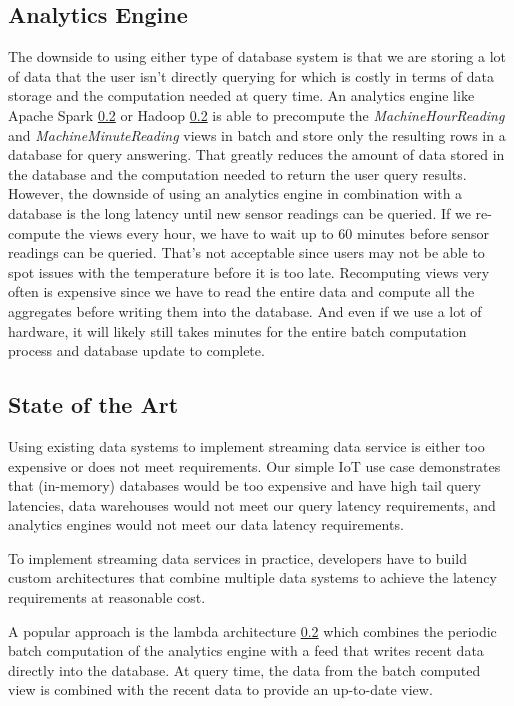 \documentclass[	DIV=calc,%
							paper=letter,%
							fontsize=11pt,%
							twocolumn]{scrartcl}	 					%
\begin{document}
\subsection{Analytics Engine}

The downside to using either type of database system is that we are storing a lot of data that the user isn't directly querying for which is costly in terms of data storage and the computation needed at query time. An analytics engine like Apache Spark \ref{} or Hadoop \ref{} is able to precompute the \emph{MachineHourReading} and \emph{MachineMinuteReading} views in batch and store only the resulting rows in a database for query answering. That greatly reduces the amount of data stored in the database and the computation needed to return the user query results. However, the downside of using an analytics engine in combination with a database is the long latency until new sensor readings can be queried. If we re-compute the views every hour, we have to wait up to 60 minutes before sensor readings can be queried. That's not acceptable since users may not be able to spot issues with the temperature before it is too late. Recomputing views very often is expensive since we have to read the entire data and compute all the aggregates before writing them into the database. And even if we use a lot of hardware, it will likely still takes minutes for the entire batch computation process and database update to complete.

\subsection{State of the Art}

Using existing data systems to implement streaming data service is either too expensive or does not meet requirements. Our simple IoT use case demonstrates that (in-memory) databases would be too expensive and have high tail query latencies, data warehouses would not meet our query latency requirements, and analytics engines would not meet our data latency requirements.

To implement streaming data services in practice, developers have to build custom architectures that combine multiple data systems to achieve the latency requirements at reasonable cost.

A popular approach is the lambda architecture \ref{} which combines the periodic batch computation of the analytics engine with a feed that writes recent data directly into the database. At query time, the data from the batch computed view is combined with the recent data to provide an up-to-date view.
\end{document}
